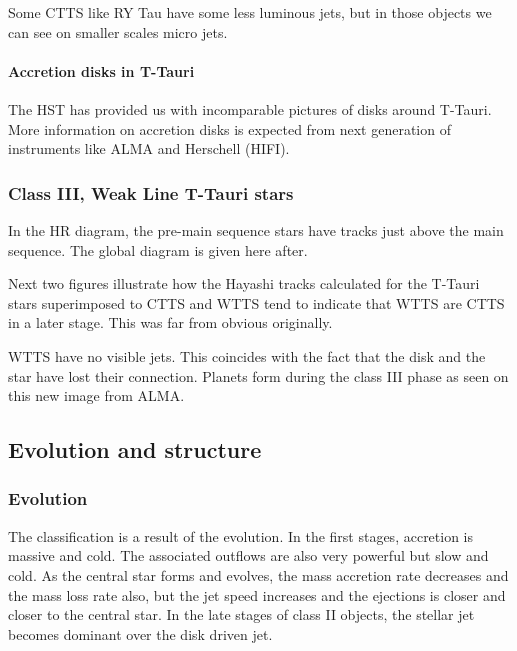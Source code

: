 \documentclass[10pt,a4paper,english]{article}
\begin{document}

Some CTTS like RY Tau have some less luminous jets, but in those objects we can
see on smaller scales micro jets.


\paragraph{Accretion disks in T-Tauri}


The HST has provided us with incomparable pictures of disks around T-Tauri.
More information on accretion disks is expected from next generation of
instruments like ALMA and Herschell (HIFI).

\subsubsection{Class III, Weak Line T-Tauri stars}

In the HR diagram, the pre-main sequence stars have tracks just above the main
sequence. The global diagram is given here after.


Next two figures illustrate how the Hayashi tracks calculated for the T-Tauri
stars superimposed to CTTS and WTTS tend to indicate that WTTS are CTTS in a
later stage. This was far from obvious originally.


WTTS have no visible jets. This coincides with the fact that the disk and the
star have lost their connection. Planets form during the class III phase as
seen on this new image from ALMA.


\subsection{Evolution and structure}

\subsubsection{Evolution}

The classification is a result of the evolution. In the first stages, accretion
is massive and cold. The associated outflows are also very powerful but slow
and cold. As the central star forms and evolves, the mass accretion rate
decreases and the mass loss rate also, but the jet speed increases and the
ejections is closer and closer to the central star. In the late stages of class
II objects, the stellar jet becomes dominant over the disk driven jet.
\end{document}
